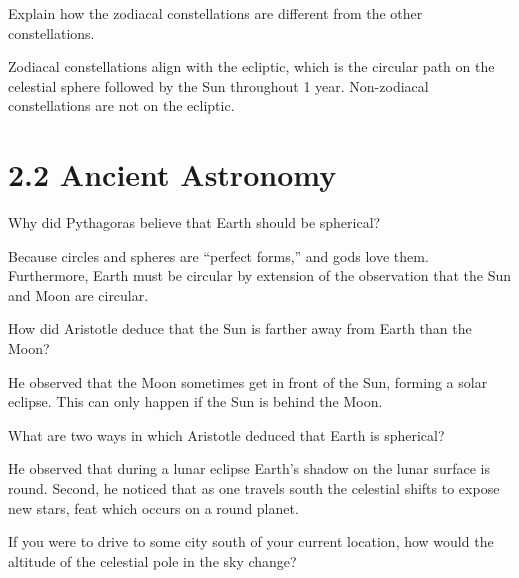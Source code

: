 \documentclass[addpoints]{exam}
\begin{document}
\begin{questions}
\question %
Explain how the zodiacal constellations are different from the other constellations.

\begin{solution}
    Zodiacal constellations align with the ecliptic, which is the circular path on the celestial sphere followed by the Sun throughout 1 year. Non-zodiacal constellations are not on the ecliptic.
\end{solution}




\clearpage
\section*{2.2 Ancient Astronomy}

\question %
Why did Pythagoras believe that Earth should be spherical?

\begin{solution}
    Because circles and spheres are ``perfect forms,'' and gods love them. Furthermore, Earth must be circular by extension of the observation that the Sun and Moon are circular.
\end{solution}

\question %
How did Aristotle deduce that the Sun is farther away from Earth than the Moon?

\begin{solution}
    He observed that the Moon sometimes get in front of the Sun, forming a solar eclipse. This can only happen if the Sun is behind the Moon.
\end{solution}

\question %
What are two ways in which Aristotle deduced that Earth is spherical?

\begin{solution}
    He observed that during a lunar eclipse Earth's shadow on the lunar surface is round. Second, he noticed that as one travels south the celestial shifts to expose new stars, feat which occurs on a round planet.
\end{solution}

\question %
If you were to drive to some city south of your current location, how would the altitude of the celestial pole in the sky change?


\end{questions}
\end{document}
